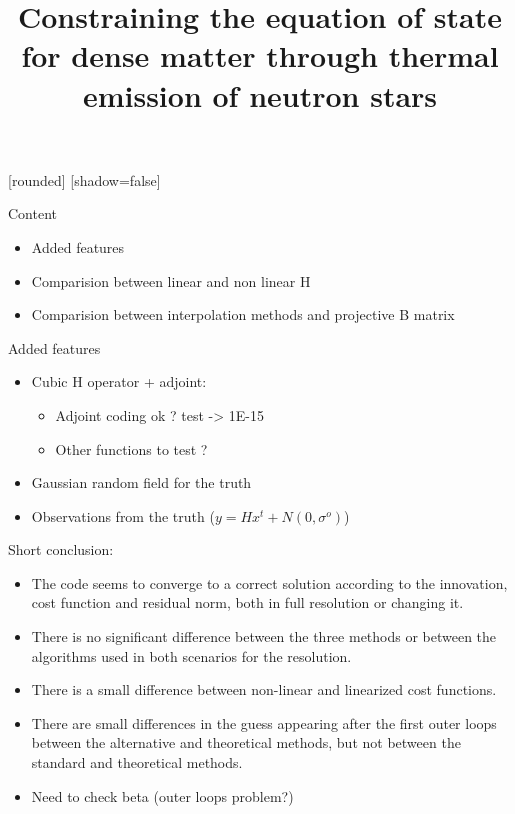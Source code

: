 \documentclass[francais]{beamer}
\title[Nicolas Baillot d'Etivaux]{Constraining the equation of state for dense matter through thermal emission of neutron stars}
\begin{document}
[rounded]%
[shadow=false]


\begin{frame}{Content}
\begin{itemize}
\item Added features
\item Comparision between linear and non linear H
\item Comparision between interpolation methods and projective B matrix
\end{itemize}
\end{frame}


\begin{frame}{Added features}
\begin{itemize}
 \item Cubic H operator + adjoint:
 \begin{itemize}
  \item Adjoint coding ok ? test -> 1E-15
  \item Other functions to test ?
 \end{itemize}
 \item Gaussian random field for the truth
 \item Observations from the truth ($y = H x^t + N(0,\sigma^o)$)
\end{itemize}
\end{frame}




\begin{frame}{Short conclusion:}
\begin{itemize}
 \item The code seems to converge to a correct solution according to the innovation, cost function and residual norm, both in full resolution or changing it.
 \item There is no significant difference between the three methods or between the algorithms used in both scenarios for the resolution.
 \item There is a small difference between non-linear and linearized cost functions.
 \item There are small differences in the guess appearing after the first outer loops between the alternative and theoretical methods, but not between the standard and theoretical methods.
 \item Need to check beta (outer loops problem?)
\end{itemize}
\end{frame}






\usebackgroundtemplate{}
\end{document}
